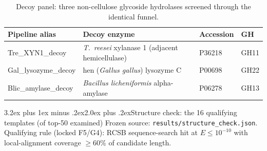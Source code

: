 \documentclass[11pt]{article}
\makeatletter
\renewcommand{\section}{\@startsection{section}{1}{\z@}%
  {3.2ex plus 1ex minus .2ex}{2.0ex plus .2ex}{\Large\bfseries\color{navy}}}
\makeatother
\begin{document}
\begin{table}[h]
\centering\footnotesize
{}
\begin{tabular}{|l|p{6.4cm}|l|l|}
\hline
\rowcolor{lightnavy}\textbf{Pipeline alias} & \textbf{Decoy enzyme} & \textbf{Accession} & \textbf{GH} \\\hline
Tre\_XYN1\_decoy & \textit{T.\ reesei} xylanase 1 (adjacent hemicellulase) & P36218 & GH11 \\\hline
Gal\_lysozyme\_decoy & hen (\textit{Gallus gallus}) lysozyme C & P00698 & GH22 \\\hline
Blic\_amylase\_decoy & \textit{Bacillus licheniformis} alpha-amylase & P06278 & GH13 \\\hline
\end{tabular}
\caption{Decoy panel: three non-cellulose glycoside hydrolases screened through the identical funnel.}
\end{table}

\section{Structure check: the 16 qualifying templates (of top-50 examined)}
Frozen source: \texttt{results/structure\_check.json}. Qualifying rule (locked F5/G4): RCSB sequence-search hit at $E \le 10^{-10}$ with local-alignment coverage $\ge$60\% of candidate length.
\end{document}
